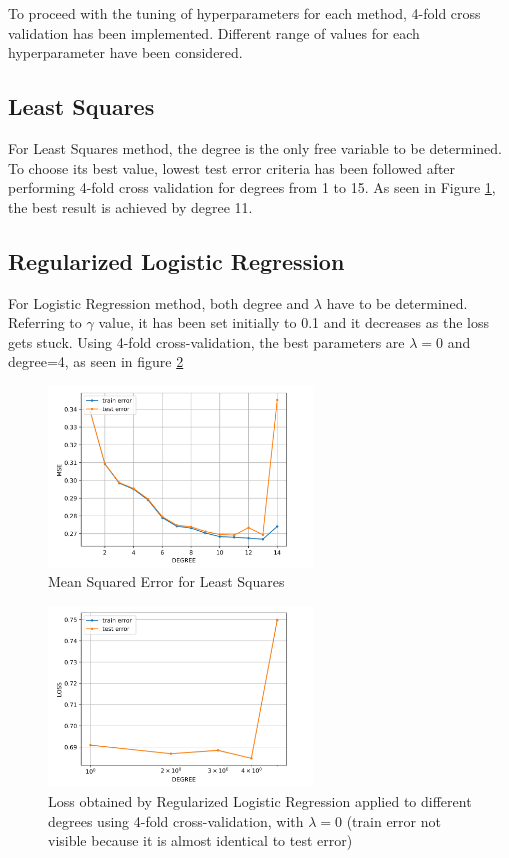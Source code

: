 \documentclass[10pt,conference]{IEEEtran}
\begin{document}
To proceed with the tuning of hyperparameters for each method, 4-fold cross validation has been implemented. Different range of values for each hyperparameter have been considered. 

\subsection{Least Squares}
For Least Squares method, the degree is the only free variable to be determined. To choose its best value, lowest test error criteria has been followed after performing 4-fold cross validation for degrees from 1 to 15. 
As seen in Figure \ref{figure 3}, the best result is achieved by degree 11.

\subsection{Regularized Logistic Regression}
For Logistic Regression method, both degree and $\lambda$ have to be determined. Referring to $\gamma$ value, it has been set initially to 0.1 and it decreases as the loss gets stuck. Using 4-fold cross-validation, the best parameters are $\lambda= 0$ and degree=4, as seen in figure \ref{figure 4}

\begin{figure}[ht!]
	\centering
	\includegraphics[width=265px]{cross_validation_LS_degress_std.png}
	\caption{Mean Squared Error for Least Squares}
\label{figure 3}
\end{figure}

\begin{figure}[ht!]
	\centering
	\includegraphics[width=265px]{Reg_Logistic_Regression.png}
	\caption{Loss obtained by Regularized Logistic Regression applied to different degrees using 4-fold cross-validation, with $\lambda=0$ (train error not visible because it is almost identical to test error)}
    \label{figure 4}
\end{figure}
 
\end{document}

